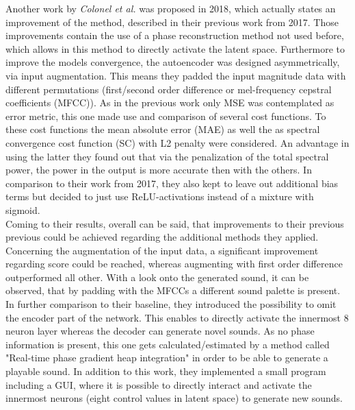 Another work by \textit{Colonel et al.} was proposed in 2018, which actually states an improvement of the method, described in their previous work from 2017. \cite{colonel2018autoencoding} Those improvements contain the use of a phase reconstruction method not used before, which allows in this method to directly activate the latent space. Furthermore to improve the models convergence, the autoencoder was designed asymmetrically, via input augmentation. This means they padded the input magnitude data with different permutations (first/second order difference or mel-frequency cepstral coefficients (MFCC)). As in the previous work only MSE was contemplated as error metric, this one made use and comparison of several cost functions. To these cost functions the mean absolute error (MAE) as well the as spectral convergence cost function (SC) with L2 penalty were considered. An advantage in using the latter they found out that via the penalization of the total spectral power, the power in the output is more accurate then with the others. In comparison to their work from 2017, they also kept to leave out additional bias terms but decided to just use ReLU-activations instead of a mixture with sigmoid.\\
Coming to their results, overall can be said, that improvements to their previous previous could be achieved regarding the additional methods they applied. Concerning the augmentation of the input data, a significant improvement regarding score could be reached, whereas augmenting with first order difference outperformed all other. With a look onto the generated sound, it can be observed, that by padding with the MFCCs a different sound palette is present. In further comparison to their baseline, they introduced the possibility to omit the encoder part of the network. This enables to directly activate the innermost 8 neuron layer whereas the decoder can generate novel sounds. As no phase information is present, this one gets calculated/estimated by a method called "Real-time phase gradient heap integration" in order to be able to generate a playable sound. In addition to this work, they implemented a small program including a GUI, where it is possible to directly interact and activate the innermost neurons (eight control values in latent space) to generate new sounds.\\

